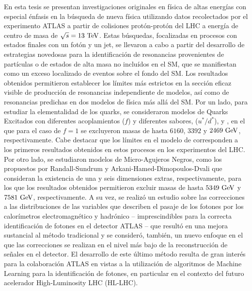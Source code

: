 En esta tesis se presentan investigaciones originales en física de altas energías con especial énfasis en la búsqueda de nueva física utilizando datos recolectados por el experimento \acs{ATLAS} a partir de colisiones protón-protón del \ac{LHC} a energía de centro de masa de \(\sqrt{s} = 13~\text{TeV}\). Estas búsquedas, focalizadas en procesos con estados finales con un fotón y un jet, se llevaron a cabo a partir del desarrollo de estrategias novedosas para la identificación de resonancias provenientes de partículas o de estados de alta masa no incluídos en el \ac{SM}, que se manifiestan como un exceso localizado de eventos sobre el fondo del \ac{SM}. Los resultados obtenidos permitieron establecer los límites más estrictos en la sección eficaz visible de producción de resonancias independiente de modelos, así como de resonancias predichas en dos modelos de física más allá del \ac{SM}. Por un lado, para estudiar la elementalidad de los quarks, se consideraron modelos de Quarks Excitados con diferentes acoplamientos (\(f\)) y diferentes sabores, \qstar (\(u^*/d^*\)), \cstar y \bstar, en el que para el caso de \(f = 1\) se excluyeron masas de hasta \(6160\), \(3392\) y \(2469~\text{GeV}\), respectivamente. Cabe destacar que los límites en el modelo de \cstar  corresponden a los primeros resultados obtenidos en estos procesos en los experimentos del \ac{LHC}. Por otro lado, se estudiaron modelos de Micro-Agujeros Negros, como los propuestos por Randall-Sundrum y Arkani-Hamed-Dimopoulos-Dvali que consideran la existencia de una y seis dimensiones extras, respectivamente, para los que los resultados obtenidos permitieron excluir masas de hasta \(5349~\text{GeV}\) y \(7581~\text{GeV}\), respectivamente. A su vez, se realizó un estudio sobre las correcciones a las distribuciones de las variables que describen el pasaje de los fotones por los calorímetros electromagnético y hadrónico -- imprescindibles para la correcta identificación de fotones en el detector \ac{ATLAS} -- que resultó en una mejora sustancial al método tradicional y se consideró, también, un nuevo enfoque en el que las correcciones se realizan en el nivel más bajo de la reconstrucción de señales en el detector. El desarrollo de este último método resulta de gran interés para la colaboración \ac{ATLAS} en vistas a la utilización de algoritmos de Machine Learning para la identificación de fotones, en particular en el contexto del futuro acelerador High-Luminosity \ac{LHC} (HL-LHC).


\noindent 
